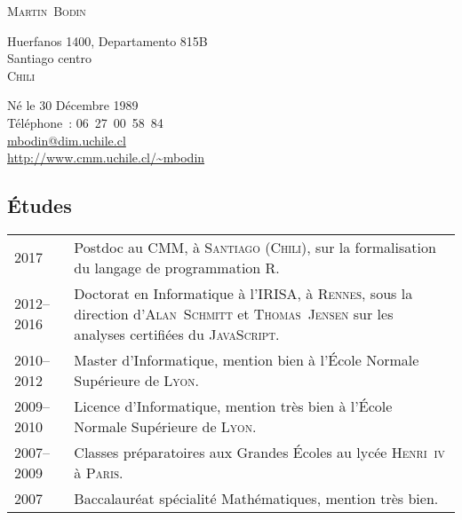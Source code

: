\documentclass[12pt,a4paper]{article}
\makeatletter
\newenvironment{datecvsection}[1]%
               {\subsection*{#1}%
                 \noindent \begin{tabular}{@{}p{\annee}p{\texte}@{}}}
               {\end{tabular}}
\makeatother
\begin{document}
\pagestyle{empty}


\newlength{\annee}
\settowidth{\annee}{9999--9999}


\newlength{\texte}
\setlength{\texte}{\textwidth} \addtolength{\texte}{-\annee} 
	\addtolength{\texte}{-2\tabcolsep}

\begin{center} \Huge \textsc{Martin~Bodin} \end{center}

\parbox[c]{.5\textwidth}
{
  \noindent
  Huerfanos 1400, Departamento 815B \\
  Santiago centro \\
  \textsc{Chili}
}
\parbox[c]{.55\textwidth}
{
\begin{flushright}
  Né le 30 Décembre 1989 \\
  \noindent Téléphone~: \mbox{06 27 00 58 84} \\
  \url{mbodin@dim.uchile.cl} \\
  \url{http://www.cmm.uchile.cl/~mbodin}
\end{flushright}
}


\begin{datecvsection}{Études}

    2017 & Postdoc au \textsc{CMM}, à \textsc{Santiago} (\textsc{Chili}), sur la formalisation du langage de programmation \textsc{R}. \\

    2012–2016 & Doctorat en Informatique à l’\textsc{IRISA}, à \textsc{Rennes}, sous la direction d’\textsc{Alan~Schmitt} et \textsc{Thomas~Jensen} sur les analyses certifiées du \textsc{JavaScript}. \\

	2010–2012 & Master d’Informatique, mention bien à l’École Normale Supérieure de \textsc{Lyon}. \\

	2009–2010 & Licence d’Informatique, mention très bien à l’École Normale Supérieure de \textsc{Lyon}. \\

	2007–2009 & Classes préparatoires aux Grandes Écoles au lycée \textsc{Henri~iv} à \textsc{Paris}. \\

	2007 & Baccalauréat spécialité Mathématiques, mention très bien. \\

\end{datecvsection}
\end{document}
